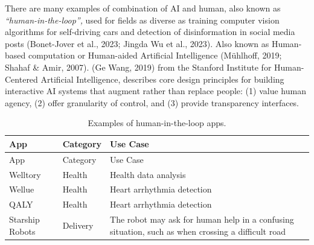 \documentclass[
  12pt,
  letterpaper,
  DIV=11,
  numbers=noendperiod]{scrartcl}
\begin{document}
There are many examples of combination of AI and human, also known as
\emph{``human-in-the-loop'',} used for fields as diverse as training
computer vision algorithms for self-driving cars and detection of
disinformation in social media posts (Bonet-Jover et al., 2023; Jingda
Wu et al., 2023). Also known as Human-based computation or Human-aided
Artificial Intelligence (Mühlhoff, 2019; Shahaf \& Amir, 2007). (Ge
Wang, 2019) from the Stanford Institute for Human-Centered Artificial
Intelligence, describes core design principles for building interactive
AI systems that augment rather than replace people: (1) value human
agency, (2) offer granularity of control, and (3) provide transparency
interfaces.

\def\pandoctableshortcapt{Human-in-the-Loop Apps}

\begin{longtable}[]{@{}
  >{\raggedright\arraybackslash}p{}
  >{\raggedright\arraybackslash}p{}
  >{\raggedright\arraybackslash}p{}@{}}
\caption[Human-in-the-Loop Apps]{Examples of human-in-the-loop
apps.}\tabularnewline
\toprule\noalign{}
\begin{minipage}[b]{\linewidth}\raggedright
App
\end{minipage} & \begin{minipage}[b]{\linewidth}\raggedright
Category
\end{minipage} & \begin{minipage}[b]{\linewidth}\raggedright
Use Case
\end{minipage} \\
\midrule\noalign{}
\endfirsthead
\toprule\noalign{}
\begin{minipage}[b]{\linewidth}\raggedright
App
\end{minipage} & \begin{minipage}[b]{\linewidth}\raggedright
Category
\end{minipage} & \begin{minipage}[b]{\linewidth}\raggedright
Use Case
\end{minipage} \\
\midrule\noalign{}
\endhead
\bottomrule\noalign{}
\endlastfoot
Welltory & Health & Health data analysis \\
Wellue & Health & Heart arrhythmia detection \\
QALY & Health & Heart arrhythmia detection \\
Starship Robots & Delivery & The robot may ask for human help in a
confusing situation, such as when crossing a difficult road \\
\end{longtable}
\end{document}
